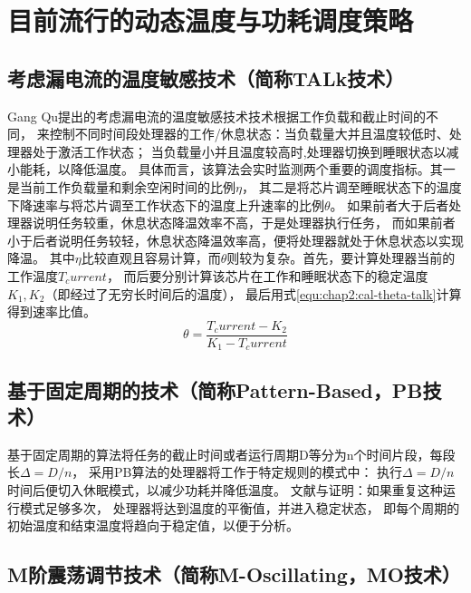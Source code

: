 \section{目前流行的动态温度与功耗调度策略}
\label{sec:algorithms}
\subsection{考虑漏电流的温度敏感技术（简称TALk技术）}
Gang Qu提出的考虑漏电流的温度敏感技术技术根据工作负载和截止时间的不同， 来控制不同时间段处理器的工作/休息状态：当负载量大并且温度较低时、处理器处于激活工作状态； 当负载量小并且温度较高时,处理器切换到睡眼状态以减小能耗，以降低温度。
具体而言，该算法会实时监测两个重要的调度指标。其一是当前工作负载量和剩余空闲时间的比例$\eta$， 其二是将芯片调至睡眠状态下的温度下降速率与将芯片调至工作状态下的温度上升速率的比例$\theta$。 如果前者大于后者处理器说明任务较重，休息状态降温效率不高，于是处理器执行任务， 而如果前者小于后者说明任务较轻，休息状态降温效率高，便将处理器就处于休息状态以实现降温。 其中$\eta$比较直观且容易计算，而$\theta$则较为复杂。首先，要计算处理器当前的工作温度$T_current$， 而后要分别计算该芯片在工作和睡眠状态下的稳定温度$K_1,K_2$（即经过了无穷长时间后的温度）， 最后用式\ref{equ:chap2:cal-theta-talk}计算得到速率比值。
\begin{equation}
\label{equ:chap2:cal-theta-talk}
\theta=\frac{T_current-K_2}{K_1-T_current}
\end{equation}



\subsection{基于固定周期的技术（简称Pattern-Based，PB技术）}

基于固定周期的算法将任务的截止时间或者运行周期D等分为n个时间片段，每段长$\Delta=D/n$， 采用PB算法的处理器将工作于特定规则的模式中： 执行$\Delta=D/n$时间后便切入休眠模式，以减少功耗并降低温度。 文献与证明：如果重复这种运行模式足够多次， 处理器将达到温度的平衡值，并进入稳定状态， 即每个周期的初始温度和结束温度将趋向于稳定值，以便于分析。

\subsection{M阶震荡调节技术（简称M-Oscillating，MO技术）}

